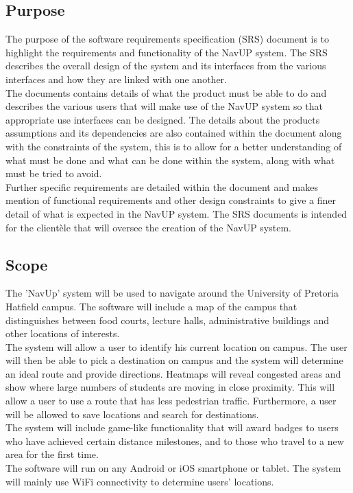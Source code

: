 \documentclass[a4paper,12pt]{article}
\begin{document}
\subsection{Purpose}
The purpose of the software requirements specification (SRS) document is to highlight the requirements and functionality of the NavUP system. The SRS describes the overall design of the system and its interfaces from the various interfaces and how they are linked with one another.\\
The documents contains details of what the product must be able to do and describes the various users that will make use of the NavUP system so that appropriate use interfaces can be designed. The details about the products assumptions and its dependencies are also contained within the document along with the constraints of the system, this is to allow for a better understanding of what must be done and what can be done within the system, along with what must be tried to avoid.\\
Further specific requirements are detailed within the document and makes mention of functional requirements and other design constraints to give a finer detail of what is expected in the NavUP system. The SRS documents is intended for the clientèle that will oversee the creation of the NavUP system.
\subsection{Scope}
The 'NavUp' system will be used to navigate around the University of Pretoria Hatfield campus. The software will include a map of the campus that distinguishes between food courts, lecture halls, administrative buildings and other locations of interests.\\
The system will allow a user to identify his current location on campus. The user will then be able to pick a destination on campus and the system will determine an ideal route and provide directions. Heatmaps will reveal congested areas and show where large numbers of students are moving in close proximity. This will allow a user to use a route that has less pedestrian traffic. Furthermore, a user will be allowed to save locations and search for destinations.\\
The system will include game-like functionality that will award badges to users who have achieved certain distance milestones, and to those who travel to a new area for the first time.\\
The software will run on any Android or iOS smartphone or tablet. The system will mainly use WiFi connectivity to determine users' locations.
\end{document}
